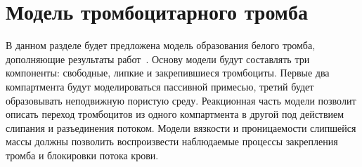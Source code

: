 % 
% 
% 
% 
% 


\section{Модель тромбоцитарного тромба}
\label{section:blood:white_clot_model}

В данном разделе будет предложена модель образования белого тромба,
дополняющие результаты работ~\cite{bouchnita2020mathematical, vassilevski2020parallel}.
Основу модели будут составлять три компоненты: свободные, липкие и закрепившиеся тромбоциты.
Первые два компартмента будут моделироваться пассивной примесью,
третий будет образовывать неподвижную пористую среду.
Реакционная часть модели позволит описать переход тромбоцитов из одного компартмента в другой
под действием слипания и разъединения потоком.
Модели вязкости и проницаемости слипшейся массы должны позволить воспроизвести наблюдаемые процессы закрепления тромба
и блокировки потока крови.

